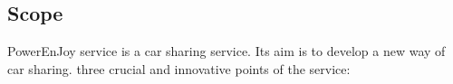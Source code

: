 \documentclass[english]{article}
\newcommand{\staff}{\textit{staff }}
\newcommand{\service}{\textit{service }}
\newcommand{\safeareas}{\textit{safe areas }}
\newcommand{\reservation}{\textit{reservation }}
\begin{document}
 \subsection{Scope}
 

PowerEnJoy service is a car sharing service. Its aim is to develop a new way of car sharing.
three crucial and innovative points of the service:
\end{document}
